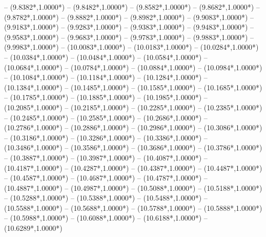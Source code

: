 {	-- ({9.8382*\dx},{1.0000*\dy})
	-- ({9.8482*\dx},{1.0000*\dy})
	-- ({9.8582*\dx},{1.0000*\dy})
	-- ({9.8682*\dx},{1.0000*\dy})
	-- ({9.8782*\dx},{1.0000*\dy})
	-- ({9.8882*\dx},{1.0000*\dy})
	-- ({9.8982*\dx},{1.0000*\dy})
	-- ({9.9083*\dx},{1.0000*\dy})
	-- ({9.9183*\dx},{1.0000*\dy})
	-- ({9.9283*\dx},{1.0000*\dy})
	-- ({9.9383*\dx},{1.0000*\dy})
	-- ({9.9483*\dx},{1.0000*\dy})
	-- ({9.9583*\dx},{1.0000*\dy})
	-- ({9.9683*\dx},{1.0000*\dy})
	-- ({9.9783*\dx},{1.0000*\dy})
	-- ({9.9883*\dx},{1.0000*\dy})
	-- ({9.9983*\dx},{1.0000*\dy})
	-- ({10.0083*\dx},{1.0000*\dy})
	-- ({10.0183*\dx},{1.0000*\dy})
	-- ({10.0284*\dx},{1.0000*\dy})
	-- ({10.0384*\dx},{1.0000*\dy})
	-- ({10.0484*\dx},{1.0000*\dy})
	-- ({10.0584*\dx},{1.0000*\dy})
	-- ({10.0684*\dx},{1.0000*\dy})
	-- ({10.0784*\dx},{1.0000*\dy})
	-- ({10.0884*\dx},{1.0000*\dy})
	-- ({10.0984*\dx},{1.0000*\dy})
	-- ({10.1084*\dx},{1.0000*\dy})
	-- ({10.1184*\dx},{1.0000*\dy})
	-- ({10.1284*\dx},{1.0000*\dy})
	-- ({10.1384*\dx},{1.0000*\dy})
	-- ({10.1485*\dx},{1.0000*\dy})
	-- ({10.1585*\dx},{1.0000*\dy})
	-- ({10.1685*\dx},{1.0000*\dy})
	-- ({10.1785*\dx},{1.0000*\dy})
	-- ({10.1885*\dx},{1.0000*\dy})
	-- ({10.1985*\dx},{1.0000*\dy})
	-- ({10.2085*\dx},{1.0000*\dy})
	-- ({10.2185*\dx},{1.0000*\dy})
	-- ({10.2285*\dx},{1.0000*\dy})
	-- ({10.2385*\dx},{1.0000*\dy})
	-- ({10.2485*\dx},{1.0000*\dy})
	-- ({10.2585*\dx},{1.0000*\dy})
	-- ({10.2686*\dx},{1.0000*\dy})
	-- ({10.2786*\dx},{1.0000*\dy})
	-- ({10.2886*\dx},{1.0000*\dy})
	-- ({10.2986*\dx},{1.0000*\dy})
	-- ({10.3086*\dx},{1.0000*\dy})
	-- ({10.3186*\dx},{1.0000*\dy})
	-- ({10.3286*\dx},{1.0000*\dy})
	-- ({10.3386*\dx},{1.0000*\dy})
	-- ({10.3486*\dx},{1.0000*\dy})
	-- ({10.3586*\dx},{1.0000*\dy})
	-- ({10.3686*\dx},{1.0000*\dy})
	-- ({10.3786*\dx},{1.0000*\dy})
	-- ({10.3887*\dx},{1.0000*\dy})
	-- ({10.3987*\dx},{1.0000*\dy})
	-- ({10.4087*\dx},{1.0000*\dy})
	-- ({10.4187*\dx},{1.0000*\dy})
	-- ({10.4287*\dx},{1.0000*\dy})
	-- ({10.4387*\dx},{1.0000*\dy})
	-- ({10.4487*\dx},{1.0000*\dy})
	-- ({10.4587*\dx},{1.0000*\dy})
	-- ({10.4687*\dx},{1.0000*\dy})
	-- ({10.4787*\dx},{1.0000*\dy})
	-- ({10.4887*\dx},{1.0000*\dy})
	-- ({10.4987*\dx},{1.0000*\dy})
	-- ({10.5088*\dx},{1.0000*\dy})
	-- ({10.5188*\dx},{1.0000*\dy})
	-- ({10.5288*\dx},{1.0000*\dy})
	-- ({10.5388*\dx},{1.0000*\dy})
	-- ({10.5488*\dx},{1.0000*\dy})
	-- ({10.5588*\dx},{1.0000*\dy})
	-- ({10.5688*\dx},{1.0000*\dy})
	-- ({10.5788*\dx},{1.0000*\dy})
	-- ({10.5888*\dx},{1.0000*\dy})
	-- ({10.5988*\dx},{1.0000*\dy})
	-- ({10.6088*\dx},{1.0000*\dy})
	-- ({10.6188*\dx},{1.0000*\dy})
	-- ({10.6289*\dx},{1.0000*\dy})
}
